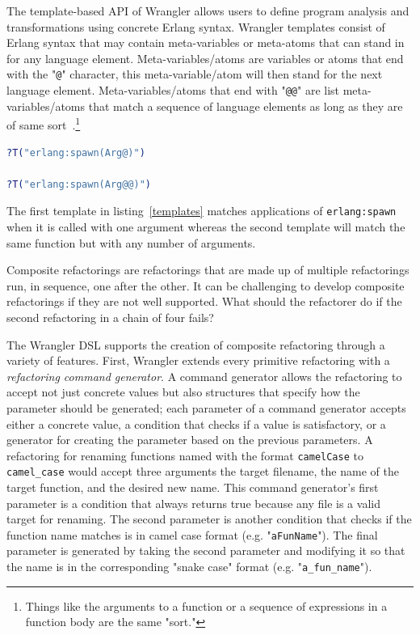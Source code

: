 The template-based API of Wrangler allows users to define program analysis and transformations using concrete Erlang syntax. Wrangler templates consist of Erlang syntax that may contain meta-variables or meta-atoms that can stand in for any language element. Meta-variables/atoms are variables or atoms that end with the "\texttt{@}" character, this meta-variable/atom will then stand for the next language element. Meta-variables/atoms that end with "\texttt{@@}" are list meta-variables/atoms that match a sequence of language elements as long as they are of same sort~\citep{letsUser}.\footnote{Things like the arguments to a function or a sequence of expressions in a function body are the same "sort."}

\begin{lstlisting}[caption={Some Wrangler templates},language=erlang,label=templates]
?T("erlang:spawn(Arg@)")

?T("erlang:spawn(Arg@@)")
\end{lstlisting}

The first template in listing~\ref{templates} matches applications of \texttt{erlang:spawn} when it is called with one argument whereas the second template will match the same function but with any number of arguments.

Composite refactorings are refactorings that are made up of multiple refactorings run, in sequence, one after the other. It can be challenging to develop composite refactorings if they are not well supported. What should the refactorer do if the second refactoring in a chain of four fails? 

The Wrangler DSL supports the creation of composite refactoring through a variety of features. First, Wrangler extends every primitive refactoring with a \textit{refactoring command generator}. A command generator allows the refactoring to accept not just concrete values but also structures that specify how the parameter should be generated; each parameter of a command generator accepts either a concrete value, a condition that checks if a value is satisfactory, or a generator for creating the parameter based on the previous parameters. A refactoring for renaming functions named with the format \texttt{camelCase} to \texttt{camel\_case} would accept three arguments the target filename, the name of the target function, and the desired new name. This command generator's first parameter is a condition that always returns true because any file is a valid target for renaming. The second parameter is another condition that checks if the function name matches is in camel case format (e.g. "\texttt{aFunName}"). The final parameter is generated by taking the second parameter and modifying it so that the name is in the corresponding "snake case" format (e.g. "\texttt{a\_fun\_name}"). 

